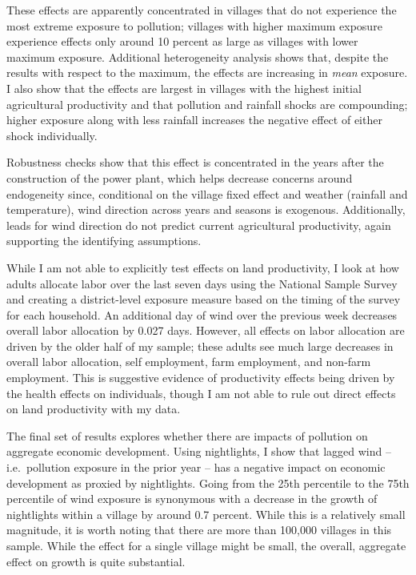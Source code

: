 \documentclass[
]{article}
\begin{document}
These effects are apparently concentrated in villages that do not experience the most extreme exposure to pollution; villages with higher maximum exposure experience effects only around 10 percent as large as villages with lower maximum exposure. Additional heterogeneity analysis shows that, despite the results with respect to the maximum, the effects are increasing in \emph{mean} exposure. I also show that the effects are largest in villages with the highest initial agricultural productivity and that pollution and rainfall shocks are compounding; higher exposure along with less rainfall increases the negative effect of either shock individually.

Robustness checks show that this effect is concentrated in the years after the construction of the power plant, which helps decrease concerns around endogeneity since, conditional on the village fixed effect and weather (rainfall and temperature), wind direction across years and seasons is exogenous. Additionally, leads for wind direction do not predict current agricultural productivity, again supporting the identifying assumptions.

While I am not able to explicitly test effects on land productivity, I look at how adults allocate labor over the last seven days using the National Sample Survey and creating a district-level exposure measure based on the timing of the survey for each household. An additional day of wind over the previous week decreases overall labor allocation by 0.027 days. However, all effects on labor allocation are driven by the older half of my sample; these adults see much large decreases in overall labor allocation, self employment, farm employment, and non-farm employment. This is suggestive evidence of productivity effects being driven by the health effects on individuals, though I am not able to rule out direct effects on land productivity with my data.

The final set of results explores whether there are impacts of pollution on aggregate economic development. Using nightlights, I show that lagged wind -- i.e.~pollution exposure in the prior year -- has a negative impact on economic development as proxied by nightlights. Going from the 25th percentile to the 75th percentile of wind exposure is synonymous with a decrease in the growth of nightlights within a village by around 0.7 percent. While this is a relatively small magnitude, it is worth noting that there are more than 100,000 villages in this sample. While the effect for a single village might be small, the overall, aggregate effect on growth is quite substantial.
\end{document}
